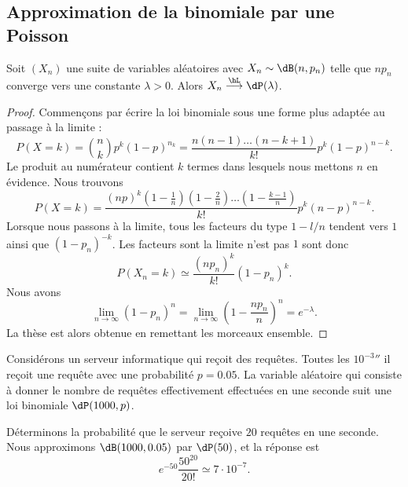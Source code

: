 \subsection{Approximation de la binomiale par une Poisson}

\begin{proposition}
    Soit \( (X_n)\) une suite de variables aléatoires avec \( X_n\sim\dB(n,p_n)\) telle que \( np_n\) converge vers une constante \( \lambda>0\). Alors \( X_n\stackrel{\hL}{\longrightarrow}\dP(\lambda)\).
\end{proposition}

\begin{proof}
    Commençons par écrire la loi binomiale sous une forme plus adaptée au passage à la limite :
    \begin{equation}
        P(X=k)={n\choose k}p^k(1-p)^{n_k}=\frac{ n(n-1)\ldots (n-k+1) }{ k! }p^k(1-p)^{n-k}.
    \end{equation}
    Le produit au numérateur contient \( k\) termes dans lesquels nous mettons \( n\) en évidence. Nous trouvons
    \begin{equation}
        P(X=k)=\frac{ (np)^k\left( 1-\frac{1}{ n } \right)\left( 1-\frac{ 2 }{ n } \right)\ldots\left( 1-\frac{ k-1 }{ n } \right) }{ k! }p^k(n-p)^{n-k}.
    \end{equation}
    Lorsque nous passons à la limite, tous les facteurs du type \( 1-l/n\) tendent vers \( 1\) ainsi que \( (1-p_n)^{-k}\). Les facteurs sont la limite n'est pas \( 1\) sont donc
    \begin{equation}
        P(X_n=k)\simeq\frac{ (np_n)^k }{ k! }(1-p_n)^k.
    \end{equation}
    Nous avons
    \begin{equation}
        \lim_{n\to \infty} (1-p_n)^n=\lim_{n\to \infty} \left( 1-\frac{ np_n }{ n } \right)^n= e^{-\lambda}.
    \end{equation}
    La thèse est alors obtenue en remettant les morceaux ensemble.
\end{proof}

\begin{example}
    Considérons un serveur informatique qui reçoit des requêtes. Toutes les \( \unit{10^{-3}}{\second}\) il reçoit une requête avec une probabilité \( p=0.05\). La variable aléatoire qui consiste à donner le nombre de requêtes effectivement effectuées en une seconde suit une loi binomiale \( \dP(1000,p)\).

    Déterminons la probabilité que le serveur reçoive \( 20\) requêtes en une seconde. Nous approximons \( \dB(1000,0.05)\) par \( \dP(50)\), et la réponse est
    \begin{equation}
        e^{-50}\frac{ 50^{20} }{ 20! }\simeq 7\cdot 10^{-7}.
    \end{equation}
\end{example}

